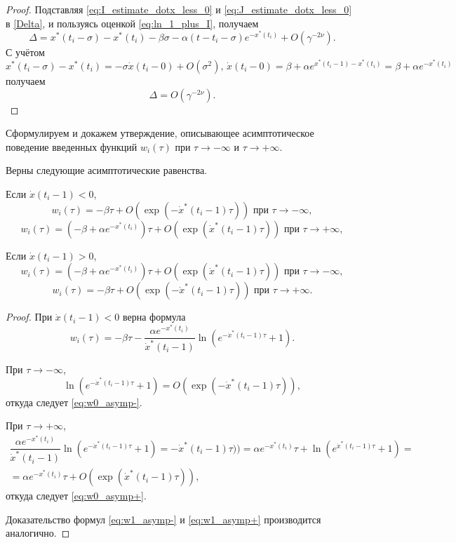 \begin{proof}
	Подставляя \eqref{eq:I_estimate_dotx_less_0} и \eqref{eq:J_estimate_dotx_less_0} в \eqref{Delta}, и пользуясь оценкой \eqref{eq:ln_1_plus_I}, получаем
	\[
	\Delta = x^*(t_i - \sigma) - x^*(t_i) - \beta \sigma - \alpha (t - t_i - \sigma) e^{-x^*(t_i)} + O(\gamma^{-2\nu}).
	\]
	С учётом 
	\[
	x^*(t_i - \sigma) - x^*(t_i) = -\sigma\dot{x}(t_i - 0) + O(\sigma^2), \, \dot{x}(t_i - 0) = \beta + \alpha e^{x^*(t_i - 1) - x^*(t_i)} = \beta + \alpha e^{-x^*(t_i)}
	\]
	получаем
	\[
	\Delta = O(\gamma^{-2\nu}).
	\]
\end{proof}

Сформулируем и докажем утверждение, описывающее асимптотическое поведение введенных функций $w_i(\tau)$ при $\tau\to-\infty$ и $\tau\to+\infty$.
%
\begin{lemma}\label{lm:lem_w_asymp} Верны следующие асимптотические равенства.

Если $\dot{x}(t_i - 1) < 0$,
\begin{equation}
	\label{eq:w0_asymp-}
	w_i(\tau) = -\beta \tau + O(\exp(-\dot{x}^*(t_i - 1) \tau)) \text{ при } \tau \to -\infty,
\end{equation}
\begin{equation}
	\label{eq:w0_asymp+}
	w_i(\tau) = (-\beta + \alpha e^{-x^*(t_i)})\tau + O(\exp(\dot{x}^*(t_i - 1) \tau)) \text{ при } \tau \to +\infty,
\end{equation}
	
Если $\dot{x}(t_i - 1) > 0$,
\begin{equation}
	\label{eq:w1_asymp-}
	w_i(\tau) = (-\beta + \alpha e^{-x^*(t_i)})\tau + O(\exp(\dot{x}^*(t_i - 1) \tau)) \text{ при } \tau \to -\infty,
\end{equation}
\begin{equation}
	\label{eq:w1_asymp+}
	w_i(\tau) = -\beta \tau + O(\exp(-\dot{x}^*(t_i - 1) \tau)) \text{ при } \tau \to +\infty.
\end{equation}
\end{lemma}
\begin{proof}
	При $\dot{x}(t_i - 1) < 0$ верна формула
	\[
	w_i(\tau) = -\beta \tau - \dfrac{\alpha e^{-x^*(t_i)}}{\dot{x}^*(t_i - 1)} \ln\left(e^{-\dot{x}^*(t_i - 1)\tau} + 1\right).
	\]
	
	При $\tau \to -\infty$,
	\[
	\ln\left(e^{-\dot{x}^*(t_i - 1)\tau} + 1\right) = O(\exp(-\dot{x}^*(t_i - 1)\tau)),
	\]
	 откуда следует \eqref{eq:w0_asymp-}.
	 
	При $\tau \to +\infty$,
	\begin{multline*}
	\dfrac{\alpha e^{-x^*(t_i)}}{\dot{x}^*(t_i - 1)} \ln\left(e^{-\dot{x}^*(t_i - 1)\tau} + 1\right) = -\dot{x}^*(t_i - 1)\tau)) = \alpha e^{-x^*(t_i)} \tau + \ln\left(e^{\dot{x}^*(t_i - 1)\tau} + 1\right) =\\
	= \alpha e^{-x^*(t_i)} \tau + O(\exp(\dot{x}^*(t_i - 1) \tau)),
	\end{multline*}
	откуда следует \eqref{eq:w0_asymp+}.
	
	Доказательство формул \eqref{eq:w1_asymp-} и \eqref{eq:w1_asymp+} производится аналогично.
\end{proof}

